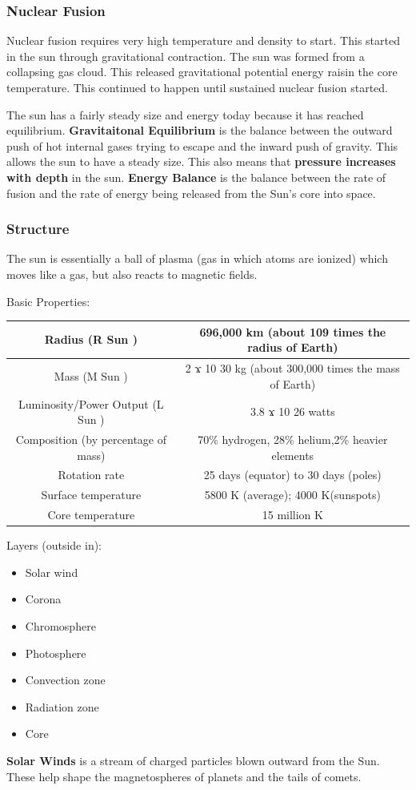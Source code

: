 \documentclass[12pt]{article}
\begin{document}
\subsubsection{Nuclear Fusion}
Nuclear fusion requires very high temperature and density to start. This started in the sun through gravitational contraction. The sun was formed from a collapsing gas cloud. This released gravitational potential energy raisin the core temperature. This continued to happen until sustained nuclear fusion started.

The sun has a fairly steady size and energy today because it has reached equilibrium. \textbf{Gravitaitonal Equilibrium} is the balance between the outward push of hot internal gases trying to escape and the inward push of gravity. This allows the sun to have a steady size. This also means that \textbf{pressure increases with depth} in the sun. \textbf{Energy Balance} is the balance between the rate of fusion and the rate of energy being released from the Sun's core into space.

\subsubsection{Structure}
The sun is essentially a ball of plasma (gas in which atoms are ionized) which moves like a gas, but also reacts to magnetic fields.

Basic Properties:\\
\begin{tabular}{|c|c|}
\hline
Radius (R Sun ) & 696,000 km (about 109 times the radius of Earth)\\
\hline
Mass (M Sun )  & 2 ϫ 10 30 kg (about 300,000 times the mass of Earth)\\
\hline
Luminosity/Power Output (L Sun ) & 3.8 ϫ 10 26 watts\\
\hline
Composition (by percentage of mass) & 70\% hydrogen, 28\% helium,2\% heavier elements\\
\hline
Rotation rate & 25 days (equator) to 30 days (poles)\\
\hline
Surface temperature & 5800 K (average); 4000 K(sunspots)\\
\hline
Core temperature & 15 million K\\
\hline
\end{tabular}

Layers (outside in):
\begin{itemize}
\item Solar wind
\item Corona
\item Chromosphere
\item Photosphere
\item Convection zone
\item Radiation zone
\item Core
\end{itemize}
\textbf{Solar Winds} is a stream of charged particles blown outward from the Sun. These help shape the magnetospheres of planets and the tails of comets.
\end{document}

